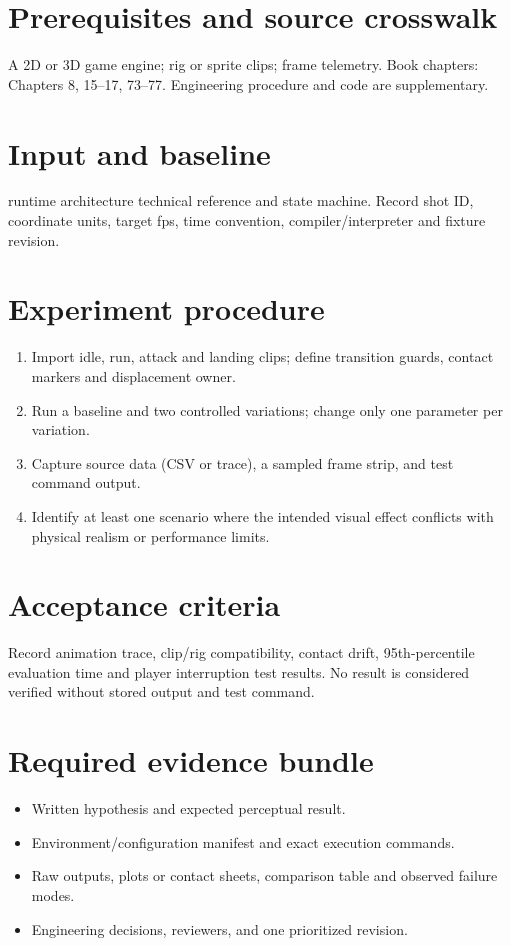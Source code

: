 \documentclass[10pt,letterpaper]{article}
\begin{document}
\makedoctitle
\makedocsummary

\section{Prerequisites and source crosswalk}
A 2D or 3D game engine; rig or sprite clips; frame telemetry. Book chapters: Chapters 8, 15--17, 73--77. Engineering procedure and code are supplementary.
\section{Input and baseline}
runtime architecture technical reference and state machine. Record shot ID, coordinate units, target fps, time convention, compiler/interpreter and fixture revision.
\section{Experiment procedure}
\begin{enumerate}
\item Import idle, run, attack and landing clips; define transition guards, contact markers and displacement owner.
\item Run a baseline and two controlled variations; change only one parameter per variation.
\item Capture source data (CSV or trace), a sampled frame strip, and test command output.
\item Identify at least one scenario where the intended visual effect conflicts with physical realism or performance limits.
\end{enumerate}
\section{Acceptance criteria}
Record animation trace, clip/rig compatibility, contact drift, 95th-percentile evaluation time and player interruption test results. No result is considered verified without stored output and test command.
\section{Required evidence bundle}
\begin{itemize}
\item Written hypothesis and expected perceptual result.
\item Environment/configuration manifest and exact execution commands.
\item Raw outputs, plots or contact sheets, comparison table and observed failure modes.
\item Engineering decisions, reviewers, and one prioritized revision.
\end{itemize}
\end{document}
